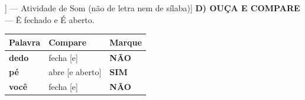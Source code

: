 \begin{exercicio}[Som /e/ [[e]] --- Atividade de Som (não de letra nem de sílaba)]
\textbf{D) OUÇA E COMPARE} --- Ê fechado e É aberto.

\begin{center}
\begin{tabular}{@{}p{4.2cm}p{6.2cm}p{1.6cm}@{}}
\hline
\textbf{Palavra} & \textbf{Compare} & \textbf{Marque} \\
\hline
\textbf{dedo} & fecha [e] & \textbf{NÃO} \\
\textbf{pé} & abre [e aberto] & \textbf{SIM} \\
\textbf{você} & fecha [e] & \textbf{NÃO} \\
\hline
\end{tabular}
\end{center}

\end{exercicio}

